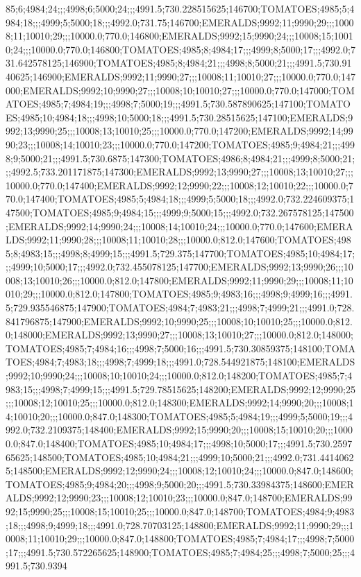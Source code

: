 85;6;4984;24;;;4998;6;5000;24;;;4991.5;730.228515625;146700;TOMATOES;4985;5;4984;18;;;4999;5;5000;18;;;4992.0;731.75;146700;EMERALDS;9992;11;9990;29;;;10008;11;10010;29;;;10000.0;770.0;146800;EMERALDS;9992;15;9990;24;;;10008;15;10010;24;;;10000.0;770.0;146800;TOMATOES;4985;8;4984;17;;;4999;8;5000;17;;;4992.0;731.642578125;146900;TOMATOES;4985;8;4984;21;;;4998;8;5000;21;;;4991.5;730.9140625;146900;EMERALDS;9992;11;9990;27;;;10008;11;10010;27;;;10000.0;770.0;147000;EMERALDS;9992;10;9990;27;;;10008;10;10010;27;;;10000.0;770.0;147000;TOMATOES;4985;7;4984;19;;;4998;7;5000;19;;;4991.5;730.587890625;147100;TOMATOES;4985;10;4984;18;;;4998;10;5000;18;;;4991.5;730.28515625;147100;EMERALDS;9992;13;9990;25;;;10008;13;10010;25;;;10000.0;770.0;147200;EMERALDS;9992;14;9990;23;;;10008;14;10010;23;;;10000.0;770.0;147200;TOMATOES;4985;9;4984;21;;;4998;9;5000;21;;;4991.5;730.6875;147300;TOMATOES;4986;8;4984;21;;;4999;8;5000;21;;;4992.5;733.201171875;147300;EMERALDS;9992;13;9990;27;;;10008;13;10010;27;;;10000.0;770.0;147400;EMERALDS;9992;12;9990;22;;;10008;12;10010;22;;;10000.0;770.0;147400;TOMATOES;4985;5;4984;18;;;4999;5;5000;18;;;4992.0;732.224609375;147500;TOMATOES;4985;9;4984;15;;;4999;9;5000;15;;;4992.0;732.267578125;147500;EMERALDS;9992;14;9990;24;;;10008;14;10010;24;;;10000.0;770.0;147600;EMERALDS;9992;11;9990;28;;;10008;11;10010;28;;;10000.0;812.0;147600;TOMATOES;4985;8;4983;15;;;4998;8;4999;15;;;4991.5;729.375;147700;TOMATOES;4985;10;4984;17;;;4999;10;5000;17;;;4992.0;732.455078125;147700;EMERALDS;9992;13;9990;26;;;10008;13;10010;26;;;10000.0;812.0;147800;EMERALDS;9992;11;9990;29;;;10008;11;10010;29;;;10000.0;812.0;147800;TOMATOES;4985;9;4983;16;;;4998;9;4999;16;;;4991.5;729.935546875;147900;TOMATOES;4984;7;4983;21;;;4998;7;4999;21;;;4991.0;728.841796875;147900;EMERALDS;9992;10;9990;25;;;10008;10;10010;25;;;10000.0;812.0;148000;EMERALDS;9992;13;9990;27;;;10008;13;10010;27;;;10000.0;812.0;148000;TOMATOES;4985;7;4984;16;;;4998;7;5000;16;;;4991.5;730.30859375;148100;TOMATOES;4984;7;4983;18;;;4998;7;4999;18;;;4991.0;728.544921875;148100;EMERALDS;9992;10;9990;24;;;10008;10;10010;24;;;10000.0;812.0;148200;TOMATOES;4985;7;4983;15;;;4998;7;4999;15;;;4991.5;729.78515625;148200;EMERALDS;9992;12;9990;25;;;10008;12;10010;25;;;10000.0;812.0;148300;EMERALDS;9992;14;9990;20;;;10008;14;10010;20;;;10000.0;847.0;148300;TOMATOES;4985;5;4984;19;;;4999;5;5000;19;;;4992.0;732.2109375;148400;EMERALDS;9992;15;9990;20;;;10008;15;10010;20;;;10000.0;847.0;148400;TOMATOES;4985;10;4984;17;;;4998;10;5000;17;;;4991.5;730.259765625;148500;TOMATOES;4985;10;4984;21;;;4999;10;5000;21;;;4992.0;731.44140625;148500;EMERALDS;9992;12;9990;24;;;10008;12;10010;24;;;10000.0;847.0;148600;TOMATOES;4985;9;4984;20;;;4998;9;5000;20;;;4991.5;730.33984375;148600;EMERALDS;9992;12;9990;23;;;10008;12;10010;23;;;10000.0;847.0;148700;EMERALDS;9992;15;9990;25;;;10008;15;10010;25;;;10000.0;847.0;148700;TOMATOES;4984;9;4983;18;;;4998;9;4999;18;;;4991.0;728.70703125;148800;EMERALDS;9992;11;9990;29;;;10008;11;10010;29;;;10000.0;847.0;148800;TOMATOES;4985;7;4984;17;;;4998;7;5000;17;;;4991.5;730.572265625;148900;TOMATOES;4985;7;4984;25;;;4998;7;5000;25;;;4991.5;730.9394